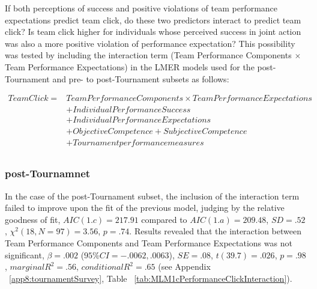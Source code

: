 \begin{CJK}{UTF8}{gbsn}
If both perceptions of success and positive violations of team performance expectations predict team click, do these two predictors interact to predict team click?  Is team click higher for individuals whose perceived success in joint action was also a more positive violation of performance expectation?  This possibility was tested by including the interaction term (Team Performance Components $\times$ Team Performance Expectations) in the LMER models used for the post-Tournament and pre- to post-Tournament subsets as follows:


    \begin{align*}
      Team Click =  & Team Performance Components \times Team Performance Expectations \\
                &+ Individual Performance Success \\
                &+ Individual Performance Expectations \\
                &+ Objective Competence + Subjective Competence  \\
                &+ Tournament performance measures \\
    \end{align*}

  \bigskip

  \subsubsection{post-Tournamnet}
  In the case of the post-Tournament subset, the inclusion of the interaction term failed to improve upon the fit of the previous model, judging by the relative goodness of fit, $AIC(1.c) = 217.91$ compared to $AIC(1.a) = 209.48$, $SD = .52 $, $\chi^2(18, N = 97) = 3.56$, $ p =.74$.
  Results revealed that the interaction between Team Performance Components and Team Performance Expectations was not significant, $\beta = .002$ ($95\% CI =  -.0062, .0063$), $SE = .08$, $t(39.7) = .026$, $p = .98$, $marginal R^2 = .56$, $conditional R^2 = .65$ (see Appendix ~\ref{app8:tournamentSurvey}, Table ~\ref{tab:MLM1cPerformanceClickInteraction}).





\end{CJK}
